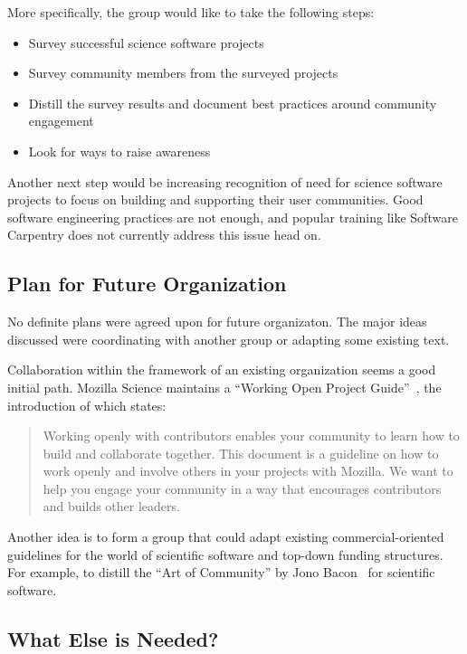 More specifically, the group would like to take the following steps:

\begin{itemize}
\item Survey successful science software projects
\item Survey community members from the surveyed projects
\item Distill the survey results and document best practices around community engagement
\item Look for ways to raise awareness
\end{itemize}

Another next step would be increasing recognition of need for science software
projects to focus on building and supporting their user communities. Good software
engineering practices are not enough, and popular training like Software
Carpentry does not currently address this issue head on.

\subsection{Plan for Future Organization}

No definite plans were agreed upon for future organizaton. The major ideas discussed
were coordinating with another group or adapting some existing text.

Collaboration within the framework of an existing organization seems a good initial
path. Mozilla Science maintains a ``Working Open Project
Guide''~\cite{working-open-wssspe3}, the introduction of which states:
\begin{quote}
Working openly with contributors enables your community to learn how to build
and collaborate together. This document is a guideline on how to work openly and
involve others in your projects with Mozilla. We want to help you engage your
community in a way that encourages contributors and builds other leaders.
 \end{quote}

 Another idea is to form a group that could adapt existing commercial-oriented 
 guidelines for the world of scientific software and top-down funding structures.
 For example, to distill the ``Art of Community'' by Jono Bacon~\cite{art-of-community}
for scientific software.


\subsection{What Else is Needed?}

